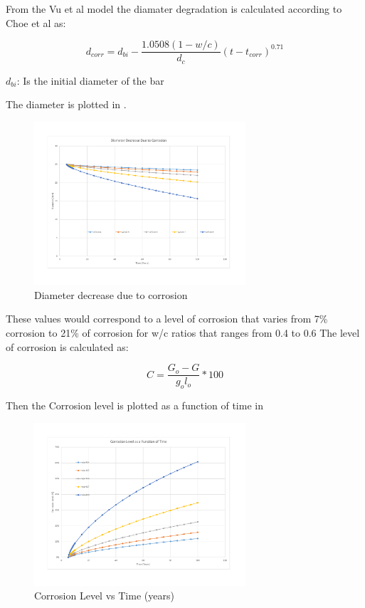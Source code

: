 From the Vu et al model the diamater degradation is calculated according to Choe et al as:

\begin{equation}
  d_{corr}=d_{bi}-\frac{1.0508(1-w/c)}{d_c} (t-t_{corr})^{0.71}
  \label{eq.six}
\end{equation} 

$d_{bi}$: Is the initial diameter of the bar

The diameter is plotted in .

\begin{figure}[htbp]
\centering
\includegraphics[width=0.7\textwidth]{Chapter-1/figs/DiameterDecrease}
\caption{Diameter decrease due to corrosion}
\label{fig:hist2}
\end{figure}

These values would correspond to a level of corrosion that varies from 7\% corrosion to 21\% of corrosion for w/c ratios that ranges from 0.4 to 0.6
The level of corrosion is calculated as:

\begin{equation}
  C=\frac{G_o-G}{g_ol_o} *100%
  \label{eq.seven}
\end{equation} 

Then the Corrosion level is plotted as a function of time in 

\begin{figure}[htbp]
\centering
\includegraphics[width=0.7\textwidth]{Chapter-1/figs/CorrosionLevel}
\caption{Corrosion Level vs Time (years)}
\label{fig:hist3}
\end{figure}

